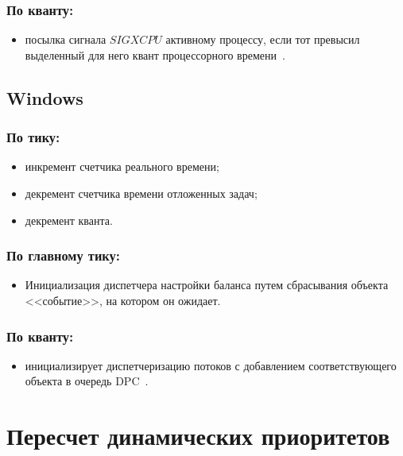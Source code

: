 \subsection*{По кванту:}

\begin{itemize}
\item посылка сигнала $SIGXCPU$ активному процессу, если тот превысил выделенный для него квант процессорного времени~\cite{unix}.
\end{itemize}

\section{Windows}

\subsection*{По тику:}

\begin{itemize}[label=---]
\item инкремент счетчика реального времени;
\item декремент счетчика времени отложенных задач;
\item декремент кванта.
\end{itemize}

\subsection*{По главному тику:}

\begin{itemize}[label=---]
\item Инициализация диспетчера настройки баланса путем сбрасывания объекта <<событие>>, на котором он ожидает.
\end{itemize}

\subsection*{По кванту:}

\begin{itemize}[label=---]
	\item инициализирует диспетчеризацию потоков с добавлением соответствующего объекта в очередь DPC~\cite{win}.
\end{itemize}

\chapter{Пересчет динамических приоритетов}

